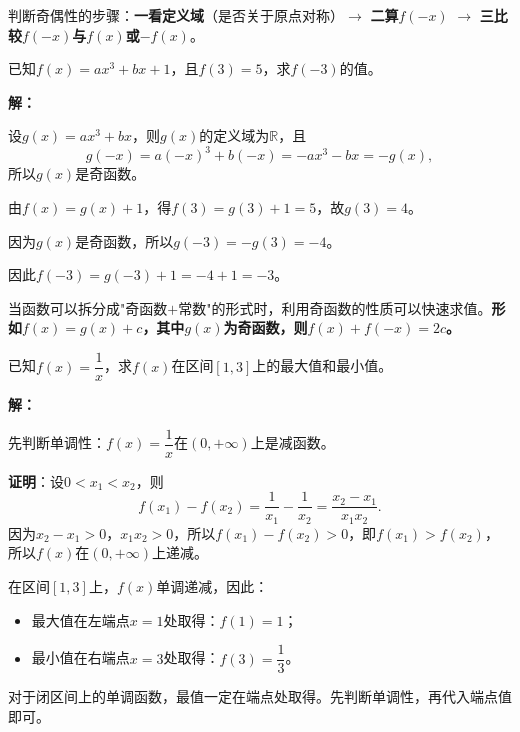 \documentclass[12pt, a4paper]{ctexart}
\begin{document}
\begin{tipbox}[方法总结]
判断奇偶性的步骤：\textbf{一看定义域}（是否关于原点对称）$\longrightarrow$ \textbf{二算$f(-x)$} $\longrightarrow$ \textbf{三比较$f(-x)$与$f(x)$或$-f(x)$}。
\end{tipbox}

\vspace{6pt}

\begin{examplebox}[【例7】利用奇偶性求值]
已知$f(x)=ax^3+bx+1$，且$f(3)=5$，求$f(-3)$的值。
\end{examplebox}

\textbf{解：}

设$g(x)=ax^3+bx$，则$g(x)$的定义域为$\mathbb{R}$，且
\[g(-x)=a(-x)^3+b(-x)=-ax^3-bx=-g(x),\]
所以$g(x)$是奇函数。

由$f(x)=g(x)+1$，得$f(3)=g(3)+1=5$，故$g(3)=4$。

因为$g(x)$是奇函数，所以$g(-3)=-g(3)=-4$。

因此$f(-3)=g(-3)+1=-4+1=-3$。

\begin{tipbox}[方法总结]
当函数可以拆分成"奇函数$+$常数"的形式时，利用奇函数的性质可以快速求值。\textbf{形如$f(x)=g(x)+c$，其中$g(x)$为奇函数，则$f(x)+f(-x)=2c$。}
\end{tipbox}

\vspace{6pt}

\begin{examplebox}
已知$f(x)=\dfrac{1}{x}$，求$f(x)$在区间$[1,3]$上的最大值和最小值。
\end{examplebox}

\textbf{解：}

先判断单调性：$f(x)=\dfrac{1}{x}$在$(0,+\infty)$上是减函数。

\textbf{证明}：设$0<x_1<x_2$，则
\[f(x_1)-f(x_2)=\frac{1}{x_1}-\frac{1}{x_2}=\frac{x_2-x_1}{x_1x_2}.\]
因为$x_2-x_1>0$，$x_1x_2>0$，所以$f(x_1)-f(x_2)>0$，即$f(x_1)>f(x_2)$，所以$f(x)$在$(0,+\infty)$上递减。

在区间$[1,3]$上，$f(x)$单调递减，因此：
\begin{itemize}[leftmargin=2em]
  \item 最大值在左端点$x=1$处取得：$f(1)=1$；
  \item 最小值在右端点$x=3$处取得：$f(3)=\dfrac{1}{3}$。
\end{itemize}

\begin{tipbox}[方法总结]
对于闭区间上的单调函数，最值一定在端点处取得。先判断单调性，再代入端点值即可。
\end{tipbox}
\end{document}

